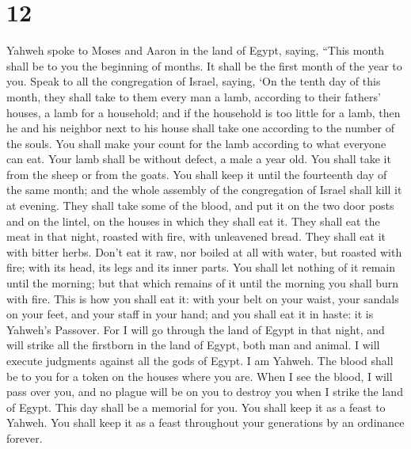 \hypertarget{section-11}{%
\section{12}\label{section-11}}

 Yahweh spoke to Moses and Aaron in the land of Egypt,
saying,  ``This month shall be to you the beginning of
months. It shall be the first month of the year to you. 
Speak to all the congregation of Israel, saying, `On the tenth day of
this month, they shall take to them every man a lamb, according to their
fathers' houses, a lamb for a household;  and if the
household is too little for a lamb, then he and his neighbor next to his
house shall take one according to the number of the souls. You shall
make your count for the lamb according to what everyone can eat.
 Your lamb shall be without defect, a male a year old. You
shall take it from the sheep or from the goats.  You shall
keep it until the fourteenth day of the same month; and the whole
assembly of the congregation of Israel shall kill it at evening.
 They shall take some of the blood, and put it on the two
door posts and on the lintel, on the houses in which they shall eat it.
 They shall eat the meat in that night, roasted with fire,
with unleavened bread. They shall eat it with bitter herbs.
 Don't eat it raw, nor boiled at all with water, but
roasted with fire; with its head, its legs and its inner parts.
 You shall let nothing of it remain until the morning;
but that which remains of it until the morning you shall burn with fire.
 This is how you shall eat it: with your belt on your
waist, your sandals on your feet, and your staff in your hand; and you
shall eat it in haste: it is Yahweh's Passover.  For I
will go through the land of Egypt in that night, and will strike all the
firstborn in the land of Egypt, both man and animal. I will execute
judgments against all the gods of Egypt. I am Yahweh. 
The blood shall be to you for a token on the houses where you are. When
I see the blood, I will pass over you, and no plague will be on you to
destroy you when I strike the land of Egypt.  This day
shall be a memorial for you. You shall keep it as a feast to Yahweh. You
shall keep it as a feast throughout your generations by an ordinance
forever.

